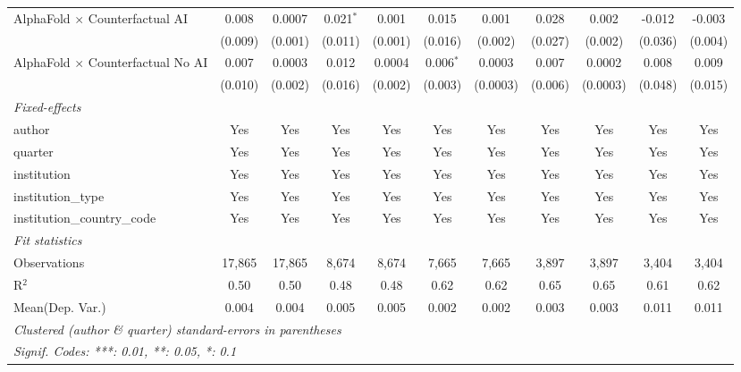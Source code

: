 \begin{tabular}{lcccccccccc}
   AlphaFold $\times$ Counterfactual AI     & 0.008   & 0.0007   & 0.021$^{*}$ & 0.001    & 0.015       & 0.001    & 0.028   & 0.002    & -0.012  & -0.003\\   
                                            & (0.009) & (0.001)  & (0.011)     & (0.001)  & (0.016)     & (0.002)  & (0.027) & (0.002)  & (0.036) & (0.004)\\   
   AlphaFold $\times$ Counterfactual No AI  & 0.007   & 0.0003   & 0.012       & 0.0004   & 0.006$^{*}$ & 0.0003   & 0.007   & 0.0002   & 0.008   & 0.009\\   
                                            & (0.010) & (0.002)  & (0.016)     & (0.002)  & (0.003)     & (0.0003) & (0.006) & (0.0003) & (0.048) & (0.015)\\   
   \midrule
   \emph{Fixed-effects}\\
   author                                   & Yes     & Yes      & Yes         & Yes      & Yes         & Yes      & Yes     & Yes      & Yes     & Yes\\  
   quarter                                  & Yes     & Yes      & Yes         & Yes      & Yes         & Yes      & Yes     & Yes      & Yes     & Yes\\  
   institution                              & Yes     & Yes      & Yes         & Yes      & Yes         & Yes      & Yes     & Yes      & Yes     & Yes\\  
   institution\_type                        & Yes     & Yes      & Yes         & Yes      & Yes         & Yes      & Yes     & Yes      & Yes     & Yes\\  
   institution\_country\_code               & Yes     & Yes      & Yes         & Yes      & Yes         & Yes      & Yes     & Yes      & Yes     & Yes\\  
   \midrule
   \emph{Fit statistics}\\
   Observations                             & 17,865  & 17,865   & 8,674       & 8,674    & 7,665       & 7,665    & 3,897   & 3,897    & 3,404   & 3,404\\  
   R$^2$                                    & 0.50    & 0.50     & 0.48        & 0.48     & 0.62        & 0.62     & 0.65    & 0.65     & 0.61    & 0.62\\  
Mean(Dep. Var.) & 0.004 & 0.004 & 0.005 & 0.005 & 0.002 & 0.002 & 0.003 & 0.003 & 0.011 & 0.011 \\
   \midrule \midrule
   \multicolumn{11}{l}{\emph{Clustered (author \& quarter) standard-errors in parentheses}}\\
   \multicolumn{11}{l}{\emph{Signif. Codes: ***: 0.01, **: 0.05, *: 0.1}}\\
\end{tabular}
\par\endgroup
